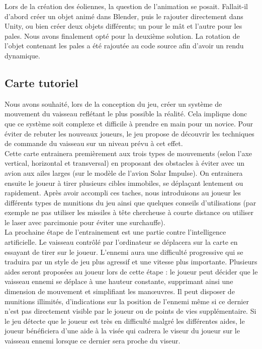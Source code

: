 \documentclass[12pt, titlepage]{article}
\begin{document}
\begin{spacing}{1.5}
Lors de la création des éoliennes, la question de l'animation se posait. Fallait-il d'abord créer un objet animé dans Blender, puis le rajouter directement dans Unity, ou bien créer deux objets différents; un pour le mât et l'autre pour les pales. Nous avons finalement opté pour la deuxième solution. La rotation de l'objet contenant les pales a été rajoutée au code source afin d'avoir un rendu dynamique.

\subsection{Carte tutoriel}

 Nous avons souhaité, lors de la conception du jeu, créer un système de mouvement du vaisseau reflétant le plus possible la réalité. Cela implique donc que ce système soit complexe et difficile à prendre en main pour un novice. Pour éviter de rebuter les nouveaux joueurs, le jeu propose de découvrir les techniques de commande du vaisseau sur un niveau prévu à cet effet. \\

Cette carte entrainera premièrement aux trois types de mouvements (selon l'axe vertical, horizontal et transversal) en proposant des obstacles à éviter avec un avion aux ailes larges (sur le modèle de l'avion Solar Impulse). On entrainera ensuite le joueur à tirer plusieurs cibles immobiles, se déplaçant lentement ou rapidement. Après avoir accompli ces taches, nous introduisons au joueur les différents types de munitions du jeu ainsi que quelques conseils d'utilisations (par exemple ne pas utiliser les missiles à tête chercheuse à courte distance ou utiliser le laser avec parcimonie pour éviter une surchauffe). \\

 La prochaine étape de l'entrainement est une partie contre l'intelligence artificielle. Le vaisseau contrôlé par l'ordinateur se déplacera sur la carte en essayant de tirer sur le joueur. L'ennemi aura une difficulté progressive qui se traduira par un style de jeu plus agressif et une vitesse plus importante. Plusieurs aides seront proposées au joueur lors de cette étape : le joueur peut décider que le vaisseau ennemi se déplace à une hauteur constante, supprimant ainsi une dimension de mouvement et simplifiant les manœuvres. Il peut disposer de munitions illimités, d'indications sur la position de l'ennemi même si ce dernier n'est pas directement visible par le joueur ou de points de vies supplémentaire. Si le jeu détecte que le joueur est très en difficulté malgré les différentes aides, le joueur bénéficiera d'une aide à la visée qui cadrera le viseur du joueur sur le vaisseau ennemi lorsque ce dernier sera proche du viseur. \\


\end{spacing}
\end{document}
